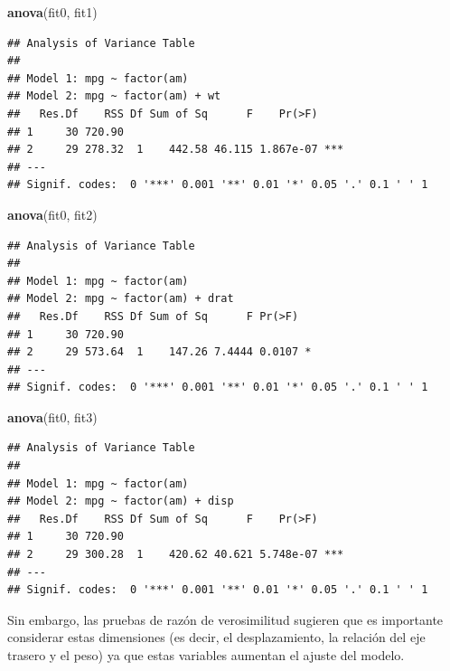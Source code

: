 \documentclass[]{article}
\newenvironment{Shaded}{\begin{snugshade}}{\end{snugshade}}
\newcommand{\KeywordTok}[1]{\textcolor[rgb]{0.13,0.29,0.53}{\textbf{{#1}}}}
\newcommand{\NormalTok}[1]{{#1}}
\numberwithin{equation}{section}
\begin{document}
\begin{Shaded}
\begin{Highlighting}[]
\KeywordTok{anova}\NormalTok{(fit0, fit1)}
\end{Highlighting}
\end{Shaded}

\begin{verbatim}
## Analysis of Variance Table
## 
## Model 1: mpg ~ factor(am)
## Model 2: mpg ~ factor(am) + wt
##   Res.Df    RSS Df Sum of Sq      F    Pr(>F)    
## 1     30 720.90                                  
## 2     29 278.32  1    442.58 46.115 1.867e-07 ***
## ---
## Signif. codes:  0 '***' 0.001 '**' 0.01 '*' 0.05 '.' 0.1 ' ' 1
\end{verbatim}

\begin{Shaded}
\begin{Highlighting}[]
\KeywordTok{anova}\NormalTok{(fit0, fit2)}
\end{Highlighting}
\end{Shaded}

\begin{verbatim}
## Analysis of Variance Table
## 
## Model 1: mpg ~ factor(am)
## Model 2: mpg ~ factor(am) + drat
##   Res.Df    RSS Df Sum of Sq      F Pr(>F)  
## 1     30 720.90                             
## 2     29 573.64  1    147.26 7.4444 0.0107 *
## ---
## Signif. codes:  0 '***' 0.001 '**' 0.01 '*' 0.05 '.' 0.1 ' ' 1
\end{verbatim}

\begin{Shaded}
\begin{Highlighting}[]
\KeywordTok{anova}\NormalTok{(fit0, fit3)}
\end{Highlighting}
\end{Shaded}

\begin{verbatim}
## Analysis of Variance Table
## 
## Model 1: mpg ~ factor(am)
## Model 2: mpg ~ factor(am) + disp
##   Res.Df    RSS Df Sum of Sq      F    Pr(>F)    
## 1     30 720.90                                  
## 2     29 300.28  1    420.62 40.621 5.748e-07 ***
## ---
## Signif. codes:  0 '***' 0.001 '**' 0.01 '*' 0.05 '.' 0.1 ' ' 1
\end{verbatim}

Sin embargo, las pruebas de razón de verosimilitud sugieren que es
importante considerar estas dimensiones (es decir, el desplazamiento, la
relación del eje trasero y el peso) ya que estas variables aumentan el
ajuste del modelo.
\end{document}

